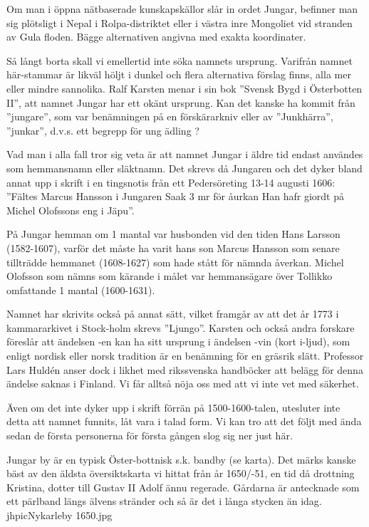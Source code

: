 

Om man i öppna nätbaserade kunskapskällor slår in ordet Jungar, befinner man sig plötsligt i Nepal i Rolpa-distriktet eller  i västra inre Mongoliet vid stranden av Gula floden. Bägge alternativen angivna med exakta koordinater.

Så långt borta skall vi emellertid inte söka namnets ursprung. Varifrån namnet här-stammar är likväl höljt i dunkel och flera alternativa förslag finns, alla mer eller mindre sannolika. Ralf Karsten menar i sin bok ”Svensk Bygd i Österbotten II”, att namnet Jungar har ett okänt ursprung. Kan det kanske ha kommit från ”jungare”, som var benämningen på en förskärarkniv eller av ”Junkhärra”, ”junkar”, d.v.s. ett begrepp för ung ädling ?

Vad man i alla fall tror sig veta är att namnet Jungar i äldre tid endast användes som hemmansnamn eller släktnamn. Det skrevs då Jungaren och det dyker bland annat upp i skrift i en tingsnotis från ett Pedersöreting 13-14 augusti 1606: ”Fältes Marcus Hansson i Jungaren Saak 3 mr för åurkan Han hafr giordt på Michel Olofssons eng i Jäpu”.

På Jungar hemman om 1 mantal var husbonden vid den tiden Hans Larsson (1582-1607), varför det måste ha varit hans son Marcus Hansson som senare tillträdde hemmanet (1608-1627) som hade stått för nämnda åverkan. Michel Olofsson som nämns som kärande i målet var hemmansägare över Tollikko omfattande 1 mantal (1600-1631).

Namnet har skrivits också på annat sätt, vilket framgår av att det år 1773 i kammararkivet i Stock-holm skrevs ”Ljungo”. Karsten och också andra forskare föreslår att ändelsen -en kan ha sitt ursprung i ändelsen -vin (kort i-ljud), som enligt nordisk eller norsk tradition är en benämning för en gräsrik slätt. Professor Lars Huldén anser dock i likhet med rikssvenska handböcker att belägg för denna ändelse saknas i Finland. Vi får alltså nöja oss med att vi inte vet med säkerhet.

Även om det inte dyker upp i skrift förrän på 1500-1600-talen, utesluter inte detta att namnet funnits, låt vara i talad form. Vi kan tro att det följt med ända sedan de första personerna för första gången slog sig ner just här.


Jungar by är en typisk Öster-bottnisk s.k. bandby (se karta). Det märks kanske bäst av den äldsta översiktskarta vi hittat från år 1650/-51, en tid då drottning Kristina, dotter till Gustav II Adolf ännu regerade. Gårdarna är antecknade som ett pärlband längs älvens stränder och så är det i långa stycken än idag. jhpic{Nykarleby 1650.jpg}

